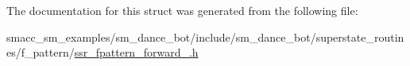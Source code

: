 The documentation for this struct was generated from the following file\+:\begin{DoxyCompactItemize}
\item 
smacc\+\_\+sm\+\_\+examples/sm\+\_\+dance\+\_\+bot/include/sm\+\_\+dance\+\_\+bot/superstate\+\_\+routines/f\+\_\+pattern/\hyperlink{ssr__fpattern__forward__2_8h}{ssr\+\_\+fpattern\+\_\+forward\+\_.\+h}\end{DoxyCompactItemize}
